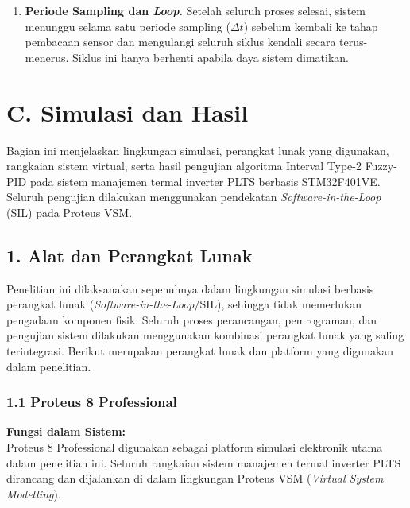 \documentclass[11pt,a4paper]{article}
\begin{document}
\begin{enumerate}
    \item \textbf{Periode Sampling dan \textit{Loop}.} Setelah seluruh proses selesai, sistem menunggu selama satu periode sampling ($\Delta t$) sebelum kembali ke tahap pembacaan sensor dan mengulangi seluruh siklus kendali secara terus-menerus. Siklus ini hanya berhenti apabila daya sistem dimatikan.
\end{enumerate}

\newpage

\newpage
\section*{C. Simulasi dan Hasil}

Bagian ini menjelaskan lingkungan simulasi, perangkat lunak yang digunakan,
rangkaian sistem virtual, serta hasil pengujian algoritma Interval Type-2
Fuzzy-PID pada sistem manajemen termal inverter PLTS berbasis STM32F401VE.
Seluruh pengujian dilakukan menggunakan pendekatan
\textit{Software-in-the-Loop} (SIL) pada Proteus VSM.

\subsection*{1. Alat dan Perangkat Lunak}
Penelitian ini dilaksanakan sepenuhnya dalam lingkungan simulasi berbasis
perangkat lunak (\textit{Software-in-the-Loop}/SIL), sehingga tidak memerlukan
pengadaan komponen fisik. Seluruh proses perancangan, pemrograman, dan pengujian
sistem dilakukan menggunakan kombinasi perangkat lunak yang saling terintegrasi.
Berikut merupakan perangkat lunak dan platform yang digunakan dalam penelitian.
\subsubsection*{1.1 Proteus 8 Professional}
\noindent\textbf{Fungsi dalam Sistem:}\\
Proteus 8 Professional digunakan sebagai platform simulasi elektronik utama
dalam penelitian ini. Seluruh rangkaian sistem manajemen termal inverter PLTS
dirancang dan dijalankan di dalam lingkungan Proteus VSM
(\textit{Virtual System Modelling}).
\vspace{6pt}
\end{document}
